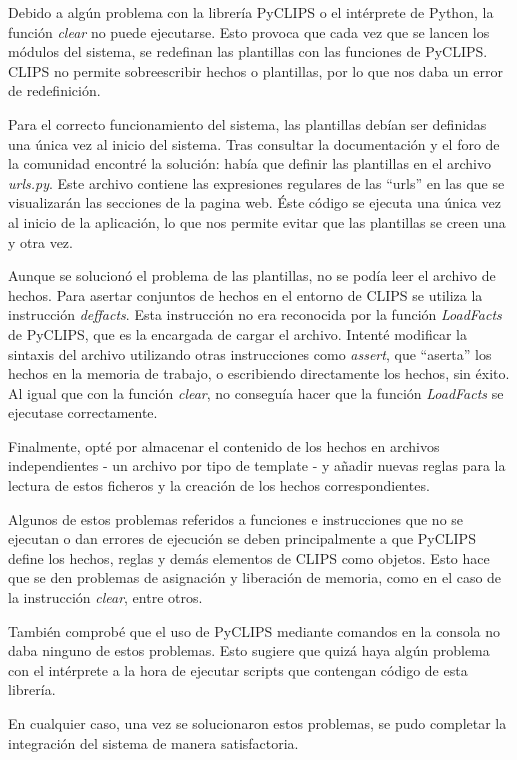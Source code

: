 Debido a algún problema con la librería PyCLIPS o el intérprete de Python, la función \textit{clear} no puede ejecutarse. Esto provoca que cada vez que se lancen los módulos del sistema, se redefinan las plantillas con las funciones de PyCLIPS. CLIPS no permite sobreescribir hechos o plantillas, por lo que nos daba un error de redefinición. 

Para el correcto funcionamiento del sistema, las plantillas debían ser definidas una única vez al inicio del sistema. Tras consultar la documentación y el foro de la comunidad encontré la solución: había que definir las plantillas en el archivo \textit{urls.py}. Este archivo contiene las expresiones regulares de las ``urls'' en las que se visualizarán las secciones de la pagina web. Éste código se ejecuta una única vez al inicio de la aplicación, lo que nos permite evitar que las plantillas se creen una y otra vez.

Aunque se solucionó el problema de las plantillas, no se podía leer el archivo de hechos. Para asertar conjuntos de hechos en el entorno de CLIPS se utiliza la instrucción \textit{deffacts}. Esta instrucción no era reconocida por la función \textit{LoadFacts} de PyCLIPS, que es la encargada de cargar el archivo. Intenté modificar la sintaxis del archivo utilizando otras instrucciones como \textit{assert}, que ``aserta'' los hechos en la memoria de trabajo, o escribiendo directamente los hechos, sin éxito. Al igual que con la función \textit{clear}, no conseguía hacer que la función \textit{LoadFacts} se ejecutase correctamente. 

Finalmente, opté por almacenar el contenido de los hechos en archivos independientes - un archivo por tipo de template - y añadir nuevas reglas para la lectura de estos ficheros y la creación de los hechos correspondientes. 

\bigskip
Algunos de estos problemas referidos a funciones e instrucciones que no se ejecutan o dan errores de ejecución se deben principalmente a que PyCLIPS define los hechos, reglas y demás elementos de CLIPS como objetos. Esto hace que se den problemas de asignación y liberación de memoria, como en el caso de la instrucción \textit{clear}, entre otros. 

También comprobé que el uso de PyCLIPS mediante comandos en la consola no daba ninguno de estos problemas. Esto sugiere que quizá haya algún problema con el intérprete a la hora de ejecutar scripts que contengan código de esta librería.

\bigskip
En cualquier caso, una vez se solucionaron estos problemas, se pudo completar la integración del sistema de manera satisfactoria.

